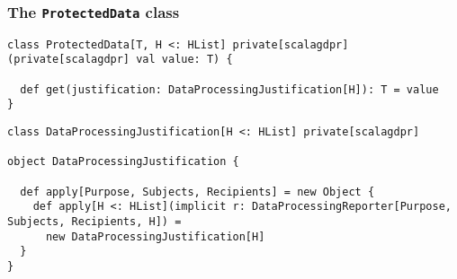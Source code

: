 \documentclass[aspectratio=169]{beamer}
\begin{document}


\begin{frame}[fragile]
\frametitle{The \texttt{ProtectedData} class}

\begin{lstlisting}[style=myScalastyle,frame=none]
class ProtectedData[T, H <: HList] private[scalagdpr](private[scalagdpr] val value: T) {

  def get(justification: DataProcessingJustification[H]): T = value
}
\end{lstlisting}
\pause
\begin{lstlisting}[style=myScalastyle,frame=none]
class DataProcessingJustification[H <: HList] private[scalagdpr]

object DataProcessingJustification {

  def apply[Purpose, Subjects, Recipients] = new Object {
    def apply[H <: HList](implicit r: DataProcessingReporter[Purpose, Subjects, Recipients, H]) =
      new DataProcessingJustification[H]
  }
}
\end{lstlisting}

\end{frame}
\end{document}
